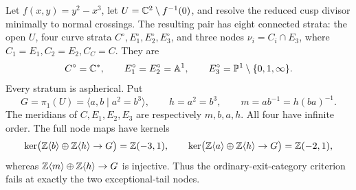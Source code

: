 \begin{proposition}
\label{P1e-cusp}
Let $f(x,y)=y^2-x^3$, let $U=\mathbb C^2\setminus f^{-1}(0)$, and resolve
the reduced cusp divisor minimally to normal crossings. The resulting
pair has eight connected strata: the open $U$, four curve strata
$C^\circ,E_1^\circ,E_2^\circ,E_3^\circ$, and three nodes
$\nu_i=C_i\cap E_3$, where $C_1=E_1,C_2=E_2,C_C=C$.
They are
\[
 C^\circ=\mathbb C^*,\qquad E_1^\circ=E_2^\circ=\mathbb A^1,\qquad
 E_3^\circ=\mathbb P^1\setminus\{0,1,\infty\}.
\]
Every stratum is aspherical. Put
\[
 G=\pi _1(U)=\langle a,b\mid a^2=b^3\rangle,\qquad
 h=a^2=b^3,\qquad m=ab^{-1}=h(ba)^{-1}.
\]
The meridians of $C,E_1,E_2,E_3$ are respectively $m,b,a,h$.
All four have infinite order. The full node maps have kernels
\[
 \ker\bigl(\mathbb Z\langle b\rangle\oplus\mathbb Z\langle h\rangle\to G\bigr)
       =\mathbb Z(-3,1),\qquad
 \ker\bigl(\mathbb Z\langle a\rangle\oplus\mathbb Z\langle h\rangle\to G\bigr)
       =\mathbb Z(-2,1),
\]
whereas $\mathbb Z\langle m\rangle\oplus\mathbb Z\langle h\rangle\to G$ is injective.
Thus the ordinary-exit-category criterion fails at exactly the two
exceptional-tail nodes.
\end{proposition}
